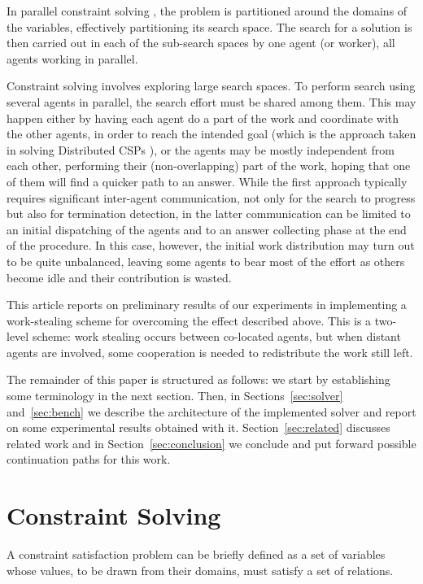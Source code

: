 \documentclass{llncs}
\begin{document}
In parallel constraint solving
\cite{lsf:tese,chip89,par-simple:trics00,hent07:parallel-CSP,confid:cp09},
the problem is partitioned around the domains of the variables,
effectively partitioning its search space. The search for a solution
is then carried out in each of the sub-search spaces by one agent (or
worker), all agents working in parallel.

Constraint solving involves exploring large search spaces. To perform
search using several agents in parallel, the search effort must be
shared among them. This may happen either by having each agent do a
part of the work and coordinate with the other agents, in order to
reach the intended goal (which is the approach taken in solving
Distributed CSPs \cite{abt-yokoo98}), or the agents may be mostly
independent from each other, performing their (non-overlapping) part
of the work, hoping that one of them will find a quicker path to an
answer. While the first approach typically requires significant
inter-agent communication, not only for the search to progress but
also for termination detection, in the latter communication can be
limited to an initial dispatching of the agents and to an answer
collecting phase at the end of the procedure. In this case, however,
the initial work distribution may turn out to be quite unbalanced,
leaving some agents to bear most of the effort as others become idle
and their contribution is wasted.

This article reports on preliminary results of our experiments in
implementing a work-stealing scheme for overcoming the effect
described above. This is a two-level scheme: work stealing occurs
between co-located agents, but when distant agents are involved, some
cooperation is needed to redistribute the work still left.

The remainder of this paper is structured as follows: we start by
establishing some terminology in the next section. Then, in
Sections~\ref{sec:solver} and~\ref{sec:bench} we describe the
architecture of the implemented solver and report on some experimental
results obtained with it. Section~\ref{sec:related} discusses related
work and in Section~\ref{sec:conclusion} we conclude and put forward
possible continuation paths for this work.


\section{Constraint Solving}
\label{sec:csp}

A constraint satisfaction problem can be briefly defined as a set of
variables whose values, to be drawn from their domains, must satisfy a
set of relations.
\end{document}
